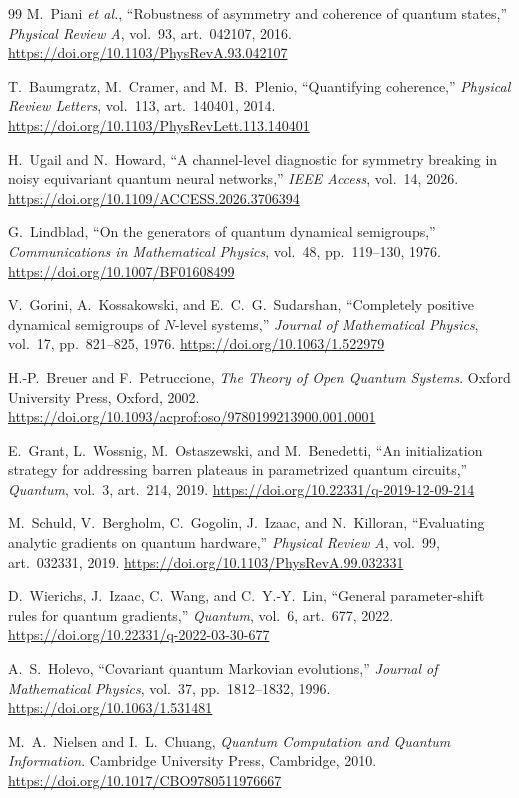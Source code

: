 \documentclass{article}
\begin{document}
\begin{thebibliography}{99}
M.~Piani \emph{et al.}, ``Robustness of asymmetry and coherence of quantum states,'' \emph{Physical Review A}, vol.~93, art.~042107, 2016. \url{https://doi.org/10.1103/PhysRevA.93.042107}

T.~Baumgratz, M.~Cramer, and M.~B.~Plenio, ``Quantifying coherence,'' \emph{Physical Review Letters}, vol.~113, art.~140401, 2014. \url{https://doi.org/10.1103/PhysRevLett.113.140401}

H.~Ugail and N.~Howard, ``A channel-level diagnostic for symmetry breaking in noisy equivariant quantum neural networks,'' \emph{IEEE Access}, vol.~14, 2026. \url{https://doi.org/10.1109/ACCESS.2026.3706394}

G.~Lindblad, ``On the generators of quantum dynamical semigroups,'' \emph{Communications in Mathematical Physics}, vol.~48, pp.~119--130, 1976. \url{https://doi.org/10.1007/BF01608499}

V.~Gorini, A.~Kossakowski, and E.~C.~G.~Sudarshan, ``Completely positive dynamical semigroups of $N$-level systems,'' \emph{Journal of Mathematical Physics}, vol.~17, pp.~821--825, 1976. \url{https://doi.org/10.1063/1.522979}

H.-P.~Breuer and F.~Petruccione, \emph{The Theory of Open Quantum Systems}. Oxford University Press, Oxford, 2002. \url{https://doi.org/10.1093/acprof:oso/9780199213900.001.0001}

E.~Grant, L.~Wossnig, M.~Ostaszewski, and M.~Benedetti, ``An initialization strategy for addressing barren plateaus in parametrized quantum circuits,'' \emph{Quantum}, vol.~3, art.~214, 2019. \url{https://doi.org/10.22331/q-2019-12-09-214}

M.~Schuld, V.~Bergholm, C.~Gogolin, J.~Izaac, and N.~Killoran, ``Evaluating analytic gradients on quantum hardware,'' \emph{Physical Review A}, vol.~99, art.~032331, 2019. \url{https://doi.org/10.1103/PhysRevA.99.032331}

D.~Wierichs, J.~Izaac, C.~Wang, and C.~Y.-Y.~Lin, ``General parameter-shift rules for quantum gradients,'' \emph{Quantum}, vol.~6, art.~677, 2022. \url{https://doi.org/10.22331/q-2022-03-30-677}

A.~S.~Holevo, ``Covariant quantum Markovian evolutions,'' \emph{Journal of Mathematical Physics}, vol.~37, pp.~1812--1832, 1996. \url{https://doi.org/10.1063/1.531481}

M.~A.~Nielsen and I.~L.~Chuang, \emph{Quantum Computation and Quantum Information}. Cambridge University Press, Cambridge, 2010. \url{https://doi.org/10.1017/CBO9780511976667}

\end{thebibliography}
\end{document}
